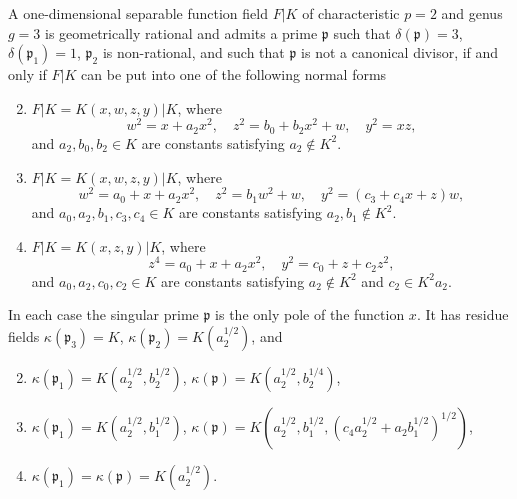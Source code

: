 \documentclass[10pt,a4paper]{amsart}
\newcommand{\de}{\delta}
\newcommand{\ka}{\kappa}
\newcommand{\pp}{\mathfrak{p}}
\begin{document}
\begin{thm}\label{2021_05_21_18:40}
A one-dimensional separable function field $F|K$ of characteristic $p=2$ and genus $g = 3$ is geometrically rational and admits a prime $\pp$ such that $\de(\pp) = 3$, $\de(\pp_1) = 1$, $\pp_2$ is non-rational, and such that $\pp$ is not a canonical divisor, if and only if 
$F|K$ can be put into one of the following normal forms
\begin{enumerate}[\upshape (a)]
    \setcounter{enumi}{1}
    \item \label{2021_05_21_18:42}
    $F|K = K(x,w,z,y)|K$, where
    \[ w^2 = x + a_2 x^2, \quad z^2 = b_0 + b_2 x^2 + w, \quad y^2 = xz, \]
    and $a_2,b_0,b_2 \in K$ are constants satisfying $a_2 \notin K^2$.
    
    \item \label{2021_05_21_18:43}
    $F|K = K(x,w,z,y)|K$, where
    \[ w^2 = a_ 0 + x + a_2 x^2, \quad z^2 = b_1 w^2 + w, \quad y^2 = (c_3 + c_4 x + z) w, \]
    and $a_0,a_2,b_1,c_3,c_4 \in K$ are constants satisfying $a_2,b_1 \notin K^2$.

    \item \label{2021_05_21_18:45}
    $F|K = K(x,z,y)|K$, where    
    \[ z^4 = a_0 + x + a_2 x^2, \quad y^2 = c_0 + z + c_2 z^2, \]
    and $a_0,a_2,c_0,c_2 \in K$ are constants satisfying $a_2\notin K^2$ and $c_2 \in K^2 a_2$.
\end{enumerate}
In each case the singular prime $\pp$ is the only pole of the function $x$.
It has residue fields $\ka(\pp_3) = K$, $\ka(\pp_2) = K(a_2^{1/2})$,
and
\begin{enumerate}[\upshape (a)]
    \setcounter{enumi}{1}
    \item $\ka({\pp_1}) = K(a_2^{1/2}, b_2^{1/2})$, $\ka(\pp) = K(a_2^{1/2}, b_2^{1/4})$,
    \item $\ka({\pp_1}) = K(a_2^{1/2}, b_1^{1/2})$, $\ka(\pp) = K(a_2^{1/2}, b_1^{1/2}, (c_4 a_2^{1/2} + a_2 b_1^{1/2})^{1/2})$,
    \item $\ka(\pp_1) = \ka(\pp) = K(a_2^{1/2})$.
\end{enumerate}
\end{thm}
\end{document}
